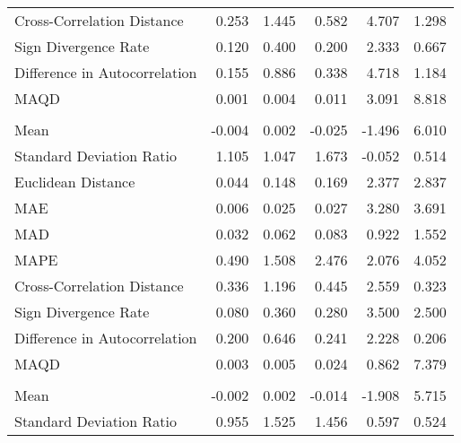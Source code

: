 \begin{landscape}
\begin{ThreePartTable}
\begin{longtable}[t]{lrrrrr}
\hspace{1em}Cross-Correlation Distance & 0.253 & 1.445 & 0.582 & 4.707 & 1.298\\
\hspace{1em}Sign Divergence Rate & 0.120 & 0.400 & 0.200 & 2.333 & 0.667\\
\hspace{1em}Difference in Autocorrelation & 0.155 & 0.886 & 0.338 & 4.718 & 1.184\\
\hspace{1em}MAQD & 0.001 & 0.004 & 0.011 & 3.091 & 8.818\\
\addlinespace[0.5em]
\multicolumn{6}{l}{\textbf{LAO}}\\
\hline
\hspace{1em}Mean & -0.004 & 0.002 & -0.025 & -1.496 & 6.010\\
\hspace{1em}Standard Deviation Ratio & 1.105 & 1.047 & 1.673 & -0.052 & 0.514\\
\hspace{1em}Euclidean Distance & 0.044 & 0.148 & 0.169 & 2.377 & 2.837\\
\hspace{1em}MAE & 0.006 & 0.025 & 0.027 & 3.280 & 3.691\\
\hspace{1em}MAD & 0.032 & 0.062 & 0.083 & 0.922 & 1.552\\
\hspace{1em}MAPE & 0.490 & 1.508 & 2.476 & 2.076 & 4.052\\
\hspace{1em}Cross-Correlation Distance & 0.336 & 1.196 & 0.445 & 2.559 & 0.323\\
\hspace{1em}Sign Divergence Rate & 0.080 & 0.360 & 0.280 & 3.500 & 2.500\\
\hspace{1em}Difference in Autocorrelation & 0.200 & 0.646 & 0.241 & 2.228 & 0.206\\
\hspace{1em}MAQD & 0.003 & 0.005 & 0.024 & 0.862 & 7.379\\
\addlinespace[0.5em]
\multicolumn{6}{l}{\textbf{LTU}}\\
\hline
\hspace{1em}Mean & -0.002 & 0.002 & -0.014 & -1.908 & 5.715\\
\hspace{1em}Standard Deviation Ratio & 0.955 & 1.525 & 1.456 & 0.597 & 0.524\\

\end{longtable}
\end{ThreePartTable}
\end{landscape}
